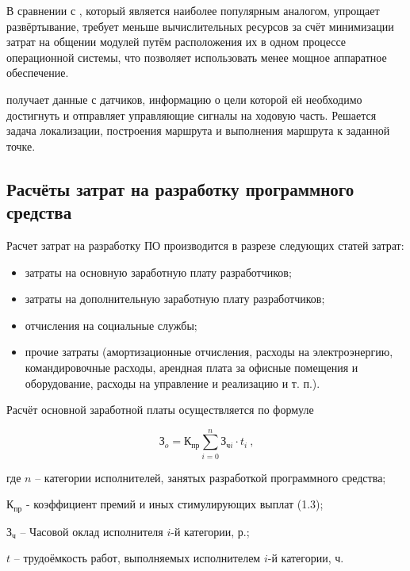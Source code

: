 В сравнении с \ros{}, который является наиболее популярным аналогом, \appname{}
упрощает развёртывание, требует меньше вычислительных ресурсов за счёт
минимизации затрат на общении модулей путём расположения их в одном процессе
операционной системы, что позволяет использовать менее мощное аппаратное
обеспечение.

\appname{} получает данные с датчиков, информацию о цели которой ей 
необходимо достигнуть  и отправляет управляющие сигналы на ходовую часть. 
Решается задача локализации, построения маршрута и выполнения маршрута 
к заданной точке. 

\subsection{Расчёты затрат на разработку программного средства}

Расчет затрат на разработку ПО производится в разрезе следующих статей затрат:

\begin{itemize}
	\item затраты на основную заработную плату разработчиков;
	\item затраты на дополнительную заработную плату разработчиков;
	\item отчисления на социальные службы;
	\item прочие затраты (амортизационные отчисления, расходы на 
		электроэнергию, командировочные расходы, арендная плата за офисные
		помещения и оборудование, расходы на управление и реализацию и т. п.).
\end{itemize}

Расчёт основной заработной платы осуществляется по формуле

\begin{equation}
	\label{eq:зарплата}
	\text{З}_o = \text{К}_{\text{пр}}\sum_{i=0}^{n} \text{З}_{\text{ч}i} \cdot t_i
	\ \text{,}
\end{equation}


\begin{explanationx}
	\item[где]  $n$  -- категории исполнителей, занятых разработкой
		программного средства;
	\item $\text{К}_\text{пр}$ - коэффициент премий и иных стимулирующих
		выплат (\num{1.3});
	\item $\text{З}_\text{ч}$ --  Часовой оклад исполнителя $i\text{-й}$
		категории, р.;
	\item $t$  -- трудоёмкость работ, выполняемых исполнителем $i\text{-й}$
		категории, ч.
\end{explanationx}


